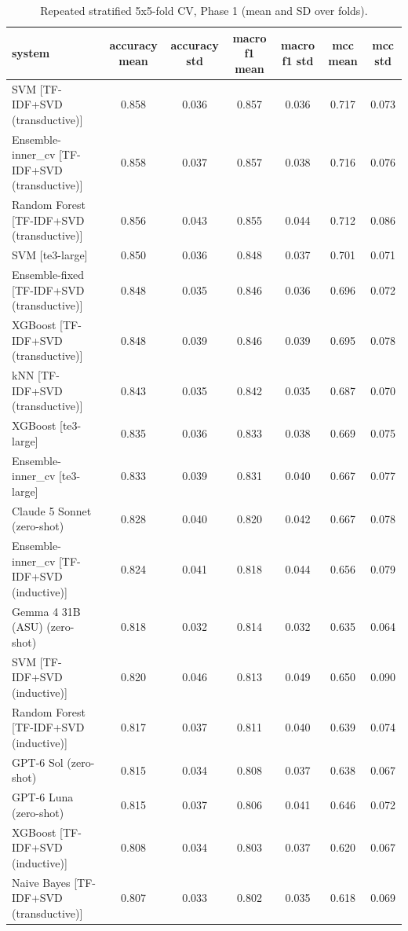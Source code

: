 \begin{table}[htbp]
\centering
\caption{Repeated stratified 5x5-fold CV, Phase 1 (mean and SD over folds).}
\label{tab:table6_repeated_cv}
\small
\begin{tabular}{lcccccc}
\toprule
\textbf{system} & \textbf{accuracy mean} & \textbf{accuracy std} & \textbf{macro f1 mean} & \textbf{macro f1 std} & \textbf{mcc mean} & \textbf{mcc std} \\
\midrule
SVM [TF-IDF+SVD (transductive)] & 0.858 & 0.036 & 0.857 & 0.036 & 0.717 & 0.073 \\
Ensemble-inner\_cv [TF-IDF+SVD (transductive)] & 0.858 & 0.037 & 0.857 & 0.038 & 0.716 & 0.076 \\
Random Forest [TF-IDF+SVD (transductive)] & 0.856 & 0.043 & 0.855 & 0.044 & 0.712 & 0.086 \\
SVM [te3-large] & 0.850 & 0.036 & 0.848 & 0.037 & 0.701 & 0.071 \\
Ensemble-fixed [TF-IDF+SVD (transductive)] & 0.848 & 0.035 & 0.846 & 0.036 & 0.696 & 0.072 \\
XGBoost [TF-IDF+SVD (transductive)] & 0.848 & 0.039 & 0.846 & 0.039 & 0.695 & 0.078 \\
kNN [TF-IDF+SVD (transductive)] & 0.843 & 0.035 & 0.842 & 0.035 & 0.687 & 0.070 \\
XGBoost [te3-large] & 0.835 & 0.036 & 0.833 & 0.038 & 0.669 & 0.075 \\
Ensemble-inner\_cv [te3-large] & 0.833 & 0.039 & 0.831 & 0.040 & 0.667 & 0.077 \\
Claude 5 Sonnet (zero-shot) & 0.828 & 0.040 & 0.820 & 0.042 & 0.667 & 0.078 \\
Ensemble-inner\_cv [TF-IDF+SVD (inductive)] & 0.824 & 0.041 & 0.818 & 0.044 & 0.656 & 0.079 \\
Gemma 4 31B (ASU) (zero-shot) & 0.818 & 0.032 & 0.814 & 0.032 & 0.635 & 0.064 \\
SVM [TF-IDF+SVD (inductive)] & 0.820 & 0.046 & 0.813 & 0.049 & 0.650 & 0.090 \\
Random Forest [TF-IDF+SVD (inductive)] & 0.817 & 0.037 & 0.811 & 0.040 & 0.639 & 0.074 \\
GPT-6 Sol (zero-shot) & 0.815 & 0.034 & 0.808 & 0.037 & 0.638 & 0.067 \\
GPT-6 Luna (zero-shot) & 0.815 & 0.037 & 0.806 & 0.041 & 0.646 & 0.072 \\
XGBoost [TF-IDF+SVD (inductive)] & 0.808 & 0.034 & 0.803 & 0.037 & 0.620 & 0.067 \\
Naive Bayes [TF-IDF+SVD (transductive)] & 0.807 & 0.033 & 0.802 & 0.035 & 0.618 & 0.069 \\

\end{tabular}
\end{table}
